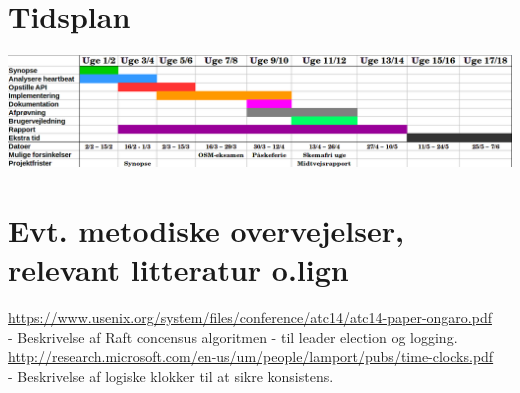 \documentclass[a4paper,12pt]{article}
\begin{document}
\section*{Tidsplan}
\includegraphics[scale=0.45]{Gantt_diagram_ny.png}

\section*{Evt. metodiske overvejelser, relevant litteratur o.lign}

\url{https://www.usenix.org/system/files/conference/atc14/atc14-paper-ongaro.pdf}  \\
- Beskrivelse af Raft concensus algoritmen - til leader election og logging.
\\[5px]
\url{http://research.microsoft.com/en-us/um/people/lamport/pubs/time-clocks.pdf}  \\
- Beskrivelse af logiske klokker til at sikre konsistens.
\end{document}

